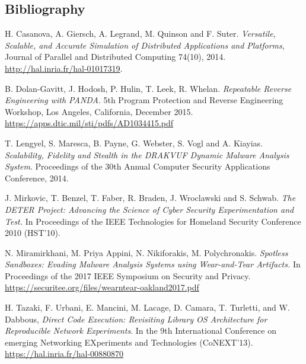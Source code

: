 \documentclass[a4paper,11pt]{article}
\begin{document}
\subsection*{Bibliography}
\begin{compactitem}
\item H. Casanova, A. Giersch, A. Legrand, M.  Quinson and F. Suter.
  \textit{Versatile, Scalable, and Accurate Simulation of Distributed
    Applications and Platforms}, Journal of Parallel and Distributed Computing
  74(10), 2014. \url{http://hal.inria.fr/hal-01017319}.
\item B. Dolan-Gavitt, J. Hodosh, P. Hulin, T. Leek, R. Whelan. \textit{Repeatable Reverse
    Engineering with PANDA}. 5th Program Protection and Reverse Engineering Workshop, Los Angeles,
  California, December 2015.  \url{https://apps.dtic.mil/sti/pdfs/AD1034415.pdf}
\item T. Lengyel, S. Maresca, B. Payne, G.  Webster, S.  Vogl and A.  Kiayias.
  \textit{Scalability, Fidelity and Stealth in the DRAKVUF Dynamic Malware Analysis System}.
  Proceedings of the 30th Annual Computer Security Applications Conference, 2014.
\item J. Mirkovic, T. Benzel, T.  Faber, R. Braden, J. Wroclawski and
  S. Schwab. \textit{The DETER Project: Advancing the Science of Cyber
    Security Experimentation and Test.}  In Proceedings of the IEEE
  Technologies for Homeland Security Conference 2010 (HST'10).
\item N. Miramirkhani, M. Priya Appini, N. Nikiforakis,
  M. Polychronakis. \textit{Spotless Sandboxes: Evading Malware
    Analysis Systems using Wear-and-Tear Artifacts.}  In Proceedings
  of the 2017 IEEE Symposium on Security and Privacy.
  \url{https://securitee.org/files/wearntear-oakland2017.pdf}
\item H. Tazaki, F. Urbani, E. Mancini, M. Lacage, D. Camara,
  T. Turletti, and W. Dabbous, \textit{Direct Code Execution:
    Revisiting Library OS Architecture for Reproducible Network
    Experiments}. In the 9th International Conference on emerging
  Networking EXperiments and Technologies
  (CoNEXT'13). \url{https://hal.inria.fr/hal-00880870}
\end{compactitem}
\end{document}
